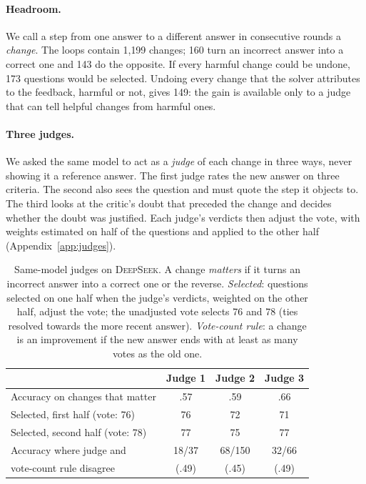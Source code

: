 \documentclass[11pt]{article}
\newcommand{\ds}{\textsc{DeepSeek}}
\begin{document}
\paragraph{Headroom.}
We call a step from one answer to a different answer in consecutive rounds a \emph{change}.
The loops contain 1{,}199 changes; 160 turn an incorrect answer into a correct one and 143 do the opposite.
If every harmful change could be undone, 173 questions would be selected.
Undoing every change that the solver attributes to the feedback, harmful or not, gives 149: the gain is available only to a judge that can tell helpful changes from harmful ones.

\paragraph{Three judges.}
We asked the same model to act as a \emph{judge} of each change in three ways, never showing it a reference answer.
The first judge rates the new answer on three criteria.
The second also sees the question and must quote the step it objects to.
The third looks at the critic's doubt that preceded the change and decides whether the doubt was justified.
Each judge's verdicts then adjust the vote, with weights estimated on half of the questions and applied to the other half (Appendix~\ref{app:judges}).

\begin{table}[t]
\centering
\small
\setlength{\tabcolsep}{3.5pt}
\begin{tabular}{@{}l ccc@{}}
\toprule
 & Judge 1 & Judge 2 & Judge 3 \\
\midrule
Accuracy on changes that matter & .57 & .59 & .66 \\
Selected, first half (vote: 76) & 76 & 72 & 71 \\
Selected, second half (vote: 78) & 77 & 75 & 77 \\
Accuracy where judge and & 18/37 & 68/150 & 32/66 \\
\quad vote-count rule disagree & (.49) & (.45) & (.49) \\
\bottomrule
\end{tabular}
\caption{Same-model judges on \ds. A change \emph{matters} if it turns an incorrect answer into a correct one or the reverse. \emph{Selected}: questions selected on one half when the judge's verdicts, weighted on the other half, adjust the vote; the unadjusted vote selects 76 and 78 (ties resolved towards the more recent answer). \emph{Vote-count rule}: a change is an improvement if the new answer ends with at least as many votes as the old one.}
\label{tab:judges}
\end{table}
\end{document}

